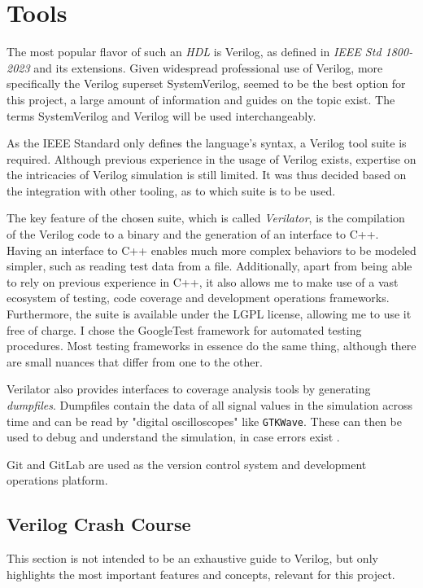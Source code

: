 \section{Tools} \label{sec:tools}

The most popular flavor of such an \textit{HDL} is Verilog, as defined in \textit{IEEE Std 1800-2023} \cite{10458102} and its extensions. Given widespread professional use of Verilog, more specifically the Verilog superset SystemVerilog, seemed to be the best option for this project, a large amount of information and guides on the topic exist. The terms SystemVerilog and Verilog will be used interchangeably. 

As the IEEE Standard only defines the language's syntax, a Verilog tool suite is required. Although previous experience in the usage of Verilog exists, expertise on the intricacies of Verilog simulation is still limited. It was thus decided based on the integration with other tooling, as to which suite is to be used. 

The key feature of the chosen suite, which is called \textit{Verilator}, is the compilation of the Verilog code to a binary and the generation of an interface to C++. Having an interface to C++ enables much more complex behaviors to be modeled simpler, such as reading test data from a file. Additionally, apart from being able to rely on previous experience in C++, it also allows me to make use of a vast ecosystem of testing, code coverage and development operations frameworks. Furthermore, the suite is available under the LGPL license, allowing me to use it free of charge. I chose the GoogleTest framework for automated testing procedures. Most testing frameworks in essence do the same thing, although there are small nuances that differ from one to the other. 

Verilator also provides interfaces to coverage analysis tools by generating \textit{dumpfiles}. Dumpfiles contain the data of all signal values in the simulation across time and can be read by "digital oscilloscopes" like \texttt{GTKWave}. These can then be used to debug and understand the simulation, in case errors exist \cite{verilatoroverview}.

Git and GitLab are used as the version control system and development operations platform.

\subsection{Verilog Crash Course}
This section is not intended to be an exhaustive guide to Verilog, but only highlights the most important features and concepts, relevant for this project.

